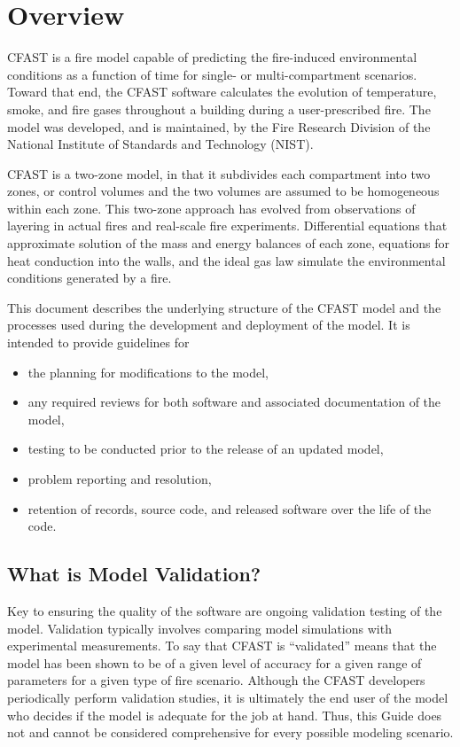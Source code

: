 
\chapter{Overview}

CFAST is a fire model capable of predicting the fire-induced environmental conditions as a function of time for single- or multi-compartment scenarios.  Toward that end, the CFAST software calculates the evolution of temperature, smoke, and fire gases throughout a building during a user-prescribed fire.  The model was developed, and is maintained, by the Fire Research Division of the National Institute of Standards and Technology (NIST).

CFAST is a two-zone model, in that it subdivides each compartment into two zones, or control volumes and the two volumes are assumed to be homogeneous within each zone.  This two-zone approach has evolved from observations of layering in actual fires and real-scale fire experiments.  Differential equations that approximate solution of the mass and energy balances of each zone, equations for heat conduction into the walls, and the ideal gas law simulate the environmental conditions generated by a fire.

This document describes the underlying structure of the CFAST model and the processes used during the development and deployment of the model. It is intended to provide guidelines for

\begin{itemize}
\item the planning for modifications to the model,
\item any required reviews for both software and associated documentation of the model,
\item testing to be conducted prior to the release of an updated model,
\item problem reporting and resolution,
\item retention of records, source code, and released software over the life of the code.
\end{itemize}

\section{What is Model Validation?}

Key to ensuring the quality of the software are ongoing validation testing of the model. Validation typically involves comparing model simulations with experimental measurements. To say that CFAST is ``validated'' means that the model has been shown to be of a given level of accuracy for a given range of parameters for a given type of fire scenario. Although the CFAST developers periodically perform validation studies, it is ultimately the end user of the model who decides if the model is adequate for the job at hand. Thus, this Guide does not and cannot be considered comprehensive for every possible modeling scenario.

